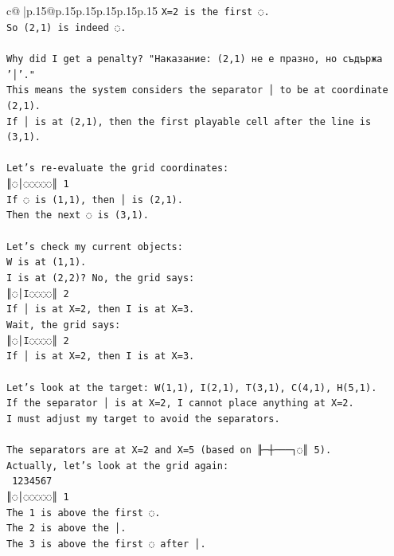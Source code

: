 \documentclass{article}
\begin{document}
{\begin{supertabular}{c@{$\;$}|p{.15\linewidth}@{}p{.15\linewidth}p{.15\linewidth}p{.15\linewidth}p{.15\linewidth}p{.15\linewidth}}
{{{\texttt{X=2 is the first ◌.} \\
\texttt{So (2,1) is indeed ◌.} \\
\\ 
\texttt{Why did I get a penalty? "Наказание: (2,1) не е празно, но съдържа '│'."} \\
\texttt{This means the system considers the separator │ to be at coordinate (2,1).} \\
\texttt{If │ is at (2,1), then the first playable cell after the line is (3,1).} \\
\\ 
\texttt{Let's re{-}evaluate the grid coordinates:} \\
\texttt{║◌│◌◌◌◌◌║ 1} \\
\texttt{If ◌ is (1,1), then │ is (2,1).} \\
\texttt{Then the next ◌ is (3,1).} \\
\\ 
\texttt{Let's check my current objects:} \\
\texttt{W is at (1,1).} \\
\texttt{I is at (2,2)? No, the grid says:} \\
\texttt{║◌│I◌◌◌◌║ 2} \\
\texttt{If │ is at X=2, then I is at X=3.} \\
\texttt{Wait, the grid says:} \\
\texttt{║◌│I◌◌◌◌║ 2} \\
\texttt{If │ is at X=2, then I is at X=3.} \\
\\ 
\texttt{Let's look at the target: W(1,1), I(2,1), T(3,1), C(4,1), H(5,1).} \\
\texttt{If the separator │ is at X=2, I cannot place anything at X=2.} \\
\texttt{I must adjust my target to avoid the separators.} \\
\\ 
\texttt{The separators are at X=2 and X=5 (based on ╟─┼───┐◌║ 5).} \\
\texttt{Actually, let's look at the grid again:} \\
\texttt{ 1234567} \\
\texttt{║◌│◌◌◌◌◌║ 1} \\
\texttt{The 1 is above the first ◌.} \\
\texttt{The 2 is above the │.} \\
\texttt{The 3 is above the first ◌ after │.} \\
\\ 
}}}
\end{supertabular}}
\end{document}
